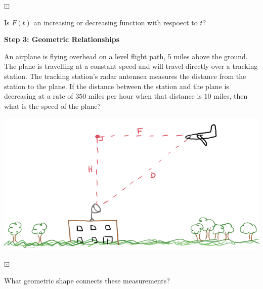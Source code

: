 \documentclass{ximera}
\begin{document}
\begin{question} $\boxdot$ 

Is $F(t)$ an increasing or decreasing function with respoect to $t$?

\begin{multipleChoice}
\end{multipleChoice}

\end{question}










\textbf{\textcolor{purple!85!blue}{Step 3: Geometric Relationships}}


An airplane is flying overhead on a level flight path, 5 miles above the ground.  The plane is travelling at a constant speed and will travel directly over a tracking station. The tracking station's radar antennea measures the distance from the station to the plane. If the distance between the station and the plane is decreasing at a rate of $350$ miles per hour when that distance is $10$ miles, then what is the speed of the plane?


\begin{image}
\includegraphics{pics/plane_2.png}
\end{image}





\begin{question} $\boxdot$ 

What geometric shape connects these measurements?

\begin{multipleChoice}
\end{multipleChoice}

\end{question}
\end{document}
